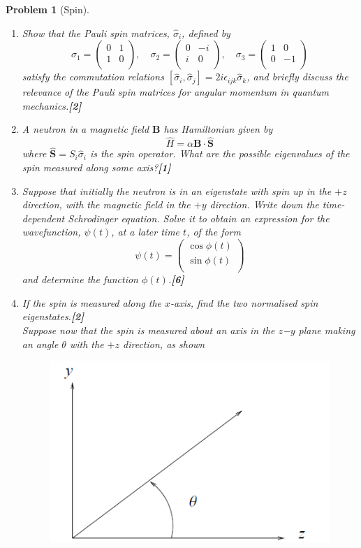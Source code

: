 \documentclass[a4paper]{article}
\theoremstyle{new}
\newtheorem{qns}{Problem}[subsection]
\begin{document}
\begin{qns}[Spin]\leavevmode
\begin{enumerate}[label=(\roman*)]
\item Show that the Pauli spin matrices, $\hat{\sigma}_i$, defined by
$$\sigma_1=\begin{pmatrix}0&1\\1&0\\\end{pmatrix},\quad\sigma_2=\begin{pmatrix}0&-i\\i&0\\\end{pmatrix},\quad\sigma_3=\begin{pmatrix}1&0\\0&-1\\\end{pmatrix}$$
satisfy the commutation relations $[\hat{\sigma}_i,\hat{\sigma}_j]=2i\epsilon_{ijk}\hat{\sigma}_k$, and briefly discuss the relevance of the Pauli spin matrices for angular momentum in quantum mechanics.\hfill\textbf{[2]}
\item A neutron in a magnetic field $\mathbf{B}$ has Hamiltonian given by
$$\hat{H}=\alpha \mathbf{B}\cdot\mathbf{\hat{S}}$$
where $\mathbf{\hat{S}}=S_i\hat{\sigma}_i$ is the spin operator. What are the possible eigenvalues of the spin measured along some axis?\hfill\textbf{[1]}
\item Suppose that initially the neutron is in an eigenstate with spin up in the $+z$ direction, with the magnetic field in the $+y$ direction. Write down the time-dependent Schrodinger equation. Solve it to obtain an expression for the wavefunction, $\psi(t)$, at a later time $t$, of the form
$$\psi(t)=\begin{pmatrix}\cos\phi(t)\\\sin\phi(t)\\\end{pmatrix}$$
and determine the function $\phi(t)$.\hfill\textbf{[6]}
\item If the spin is measured along the $x$-axis, find the two normalised spin eigenstates.\hfill\textbf{[2]}\\[5pt]
Suppose now that the spin is measured about an axis in the $z$−$y$ plane making an angle $\theta$ with the $+z$ direction, as shown
\begin{figure}[H]
    \centering
    \includegraphics[scale=0.5]{2012P1B8Q.PNG}

\end{figure}
\end{enumerate}
\end{qns}
\end{document}
